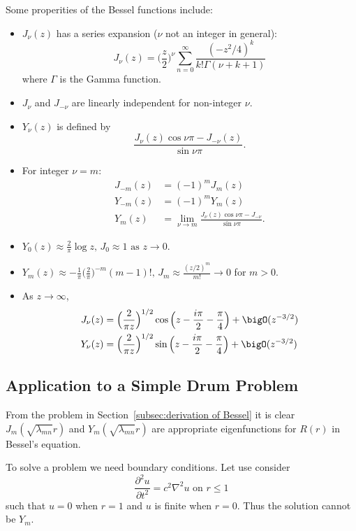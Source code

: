 \documentclass[a4paper]{article}
\begin{document}
Some properities of the Bessel functions include:

\begin{itemize}
\item \(J_\nu(z)\) has a series expansion (\(\nu\) not an integer in general):
  \[
    J_\nu(z) = \Big( \frac{z}{2} \Big)^\nu \sum_{n=0}^{\infty} \frac{(-z^2/4)^k}{k!\Gamma(\nu+k+1)}
  \]
  where \(\Gamma\) is the Gamma function.

\item \(J_\nu\) and \(J_{-\nu}\) are linearly independent for non-integer \(\nu\).
\item \(Y_\nu(z)\) is defined by
  \[
    \frac{J_\nu(z)\cos\nu\pi - J_{-\nu}(z)}{\sin\nu\pi}.
  \]

\item For integer \(\nu=m\):
  \begin{align*}
    J_{-m}(z) &= (-1)^m J_m(z) \\
    Y_{-m}(z) &= (-1)^m Y_m(z) \\
    Y_m(z) &= \lim_{\nu\to m} \frac{J_\nu(z)\cos\nu\pi - J_{-\nu}}{\sin \nu\pi}.
  \end{align*}
\item \(Y_0(z) \approx \frac{2}{\pi} \log z, \, J_0\approx 1 \text{ as } z\to 0 \).
\item \(Y_m(z) \approx - \frac{1}{\pi} \Big( \frac{2}{\pi} \Big)^{-m} (m-1)!,\, J_m \approx \frac{(z/2)^m}{m!} \to 0\) for \(m>0\).
\item As \(z\to \infty\),
  \begin{align*}
    J_\nu(z) &= \Big( \frac{2}{\pi z} \Big)^{1/2} \cos \Big(z - \frac{i\pi}{2} - \frac{\pi}{4} \Big) + \bigO(z^{-3/2}) \\
    Y_\nu(z) &= \Big( \frac{2}{\pi z} \Big)^{1/2} \sin \Big(z - \frac{i\pi}{2} - \frac{\pi}{4} \Big) + \bigO(z^{-3/2})
  \end{align*}
\end{itemize}

\subsection{Application to a Simple Drum Problem}

From the problem in Section~\ref{subsec:derivation of Bessel} it is clear \(J_m(\sqrt{\lambda_{mn}}r)\) and \(Y_m(\sqrt{\lambda_{mn}}r)\) are appropriate eigenfunctions for \(R(r)\) in Bessel's equation.

To solve a problem we need boundary conditions. Let use consider
\[
  \frac{\partial^2 u}{\partial t^2} = c^2\nabla^2u \text{ on } r\leq1
\]
such that \(u=0\) when \(r=1\) and \(u\) is finite when \(r=0\). Thus the solution cannot be \(Y_m\).
\end{document}
